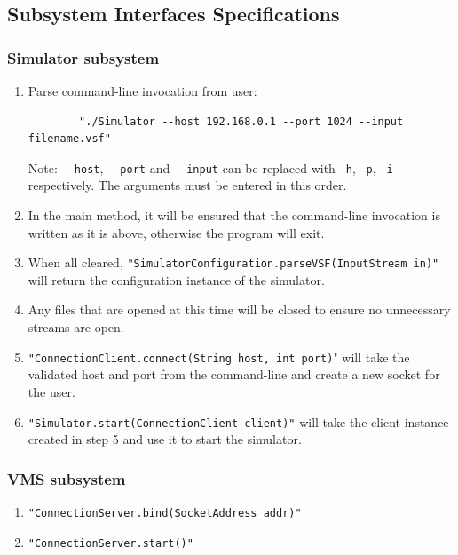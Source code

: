\documentclass{article}
\begin{document}
\break

\subsection{Subsystem Interfaces Specifications} %

\subsubsection{Simulator subsystem} %

\begin{enumerate}
  \item Parse command-line invocation from user: 
		\begin{verbatim}
		"./Simulator --host 192.168.0.1 --port 1024 --input filename.vsf"
		\end{verbatim}
		Note: \verb|--host|, \verb|--port| and \verb|--input| can be replaced with \verb|-h|, \verb|-p|, \verb|-i| respectively.
		\newline The arguments must be entered in this order.
  \item In the main method, it will be ensured that the command-line invocation is written as it is above, otherwise the program will exit.
  \item When all cleared, \verb|"SimulatorConfiguration.parseVSF(InputStream in)"| will return the configuration instance of the simulator.
  \item Any files that are opened at this time will be closed to ensure no unnecessary streams are open.
	\item \verb|"ConnectionClient.connect(String host, int port)|" will take the validated host and port from the command-line and create a new socket for the user.
	\item \verb|"Simulator.start(ConnectionClient client)"| will take the client instance created in step 5 and use it to start the simulator.	
\end{enumerate}

\subsubsection{VMS subsystem} %

\begin{enumerate}
  \item \verb |"ConnectionServer.bind(SocketAddress addr)"|
	\item \verb |"ConnectionServer.start()"|
\end{enumerate}
\end{document}
